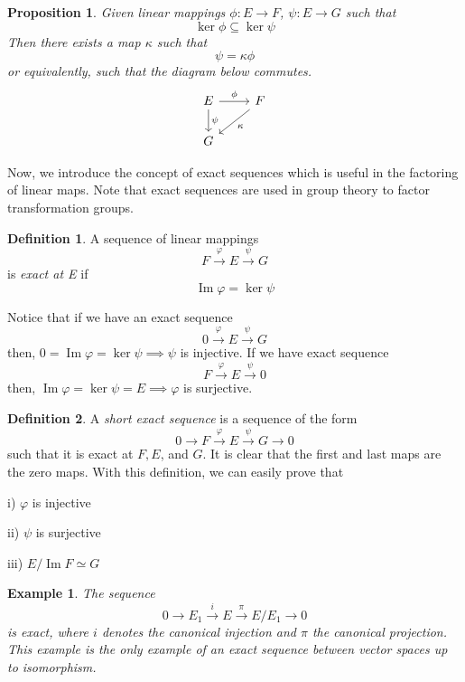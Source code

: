 \documentclass{article}
\DeclareMathOperator{\im}{Im}
\newtheorem{proposition}[theorem]{Proposition}
\newtheorem{example}{Example}[section]
\theoremstyle{remark}
\theoremstyle{definition}
\newtheorem{definition}{Definition}[section]
\begin{document}
    \begin{proposition}
    Given linear mappings $\phi: E \longrightarrow F$, $\psi: E \longrightarrow G$ such that
    \[\ker{\phi} \subseteq \ker{\psi}\]
    Then there exists a map $\kappa$ such that 
    \[ \psi = \kappa \phi\]
    or equivalently, such that the diagram below commutes. 
    \[\begin{tikzcd} 
        E \arrow{r}{\phi} \arrow{d}{\psi} & F \arrow{dl}{\kappa} \\
        G 
    \end{tikzcd}\]
    \end{proposition}

    Now, we introduce the concept of exact sequences which is useful in the factoring of linear maps. Note that exact sequences are used in group theory to factor transformation groups. 

    \begin{definition}
    A sequence of linear mappings 
    \[F \xrightarrow{\varphi} E \xrightarrow{\psi} G\]
    is \textit{exact at E} if
    \[ \im{\varphi} = \ker{\psi}\]
    \end{definition}

    Notice that if we have an exact sequence 
    \[0 \xrightarrow{\varphi} E \xrightarrow{\psi} G\]
    then, $0 = \im{\varphi} = \ker{\psi} \implies \psi$ is injective. If we have exact sequence 
    \[F \xrightarrow{\varphi} E \xrightarrow{\psi} 0\]
    then, $\im{\varphi} = \ker{\psi} = E \implies \varphi$ is surjective. 

    \begin{definition}
    A \textit{short exact sequence} is a sequence of the form
    \[0 \xrightarrow{} F \xrightarrow{\varphi} E \xrightarrow{\psi} G \xrightarrow{} 0\]
    such that it is exact at $F, E$, and $G$. It is clear that the first and last maps are the zero maps. With this definition, we can easily prove that

    i) $\varphi$ is injective

    ii) $\psi$ is surjective

    iii) $E / \im{F} \simeq G$
    \end{definition}

    \begin{example}
    The sequence 
    \[0 \xrightarrow{} E_1 \xrightarrow{i} E \xrightarrow{\pi} E / E_1 \xrightarrow{} 0\]
    is exact, where $i$ denotes the canonical injection and $\pi$ the canonical projection. This example is the only example of an exact sequence between vector spaces up to isomorphism. 
    \end{example}
\end{document}
